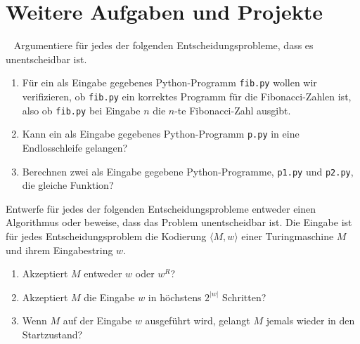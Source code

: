 \documentclass{uebung_cs}
\begin{document}
\section*{Weitere Aufgaben und Projekte \projekt}

\begin{exercise}[Entscheidbarkeit IV]\
	Argumentiere für jedes der folgenden Entscheidungsprobleme, dass es unentscheidbar ist.
	\begin{enumerate}
		\item Für ein als Eingabe gegebenes Python-Programm \texttt{fib.py} wollen wir verifizieren, ob \texttt{fib.py} ein korrektes Programm für die Fibonacci-Zahlen ist, also ob \texttt{fib.py} bei Eingabe $n$ die $n$-te Fibonacci-Zahl ausgibt.
		\item Kann ein als Eingabe gegebenes Python-Programm \texttt{p.py} in eine Endlosschleife gelangen?
		\item Berechnen zwei als Eingabe gegebene Python-Programme, \texttt{p1.py} und \texttt{p2.py}, die gleiche Funktion?
	\end{enumerate}
\end{exercise}
\begin{exercise}[Entscheidbarkeit V]
	Entwerfe für jedes der folgenden Entscheidungsprobleme entweder einen Algorithmus oder beweise, dass das Problem unentscheidbar ist. Die Eingabe ist für jedes Entscheidungsproblem die Kodierung $\langle M,w \rangle$ einer Turingmaschine $M$ und ihrem Eingabestring $w$.
	\begin{enumerate}
		\item Akzeptiert $M$ entweder $w$ oder $w^R$?
		\item Akzeptiert $M$ die Eingabe $w$ in höchstens $2^{|w|}$ Schritten?
		\item Wenn $M$ auf der Eingabe $w$ ausgeführt wird, gelangt $M$ jemals wieder in den Startzustand?
	\end{enumerate}
\end{exercise}
\end{document}
